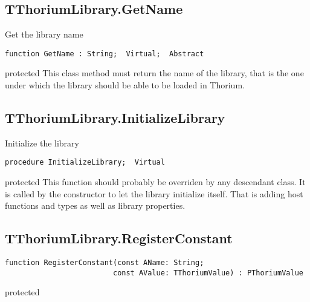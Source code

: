 \subsection{TThoriumLibrary.GetName}
\label{thoriumcorepkg:thorium:tthoriumlibrary:getname}
\begin{FPCList}
\Synopsis
Get the library name\Declaration 

\begin{verbatim}
function GetName : String;  Virtual;  Abstract
\end{verbatim}
\Visibility
protected
\Description
This class method must return the name of the library, that is the one under which the library should be able to be loaded in Thorium.\end{FPCList}
\subsection{TThoriumLibrary.InitializeLibrary}
\label{thoriumcorepkg:thorium:tthoriumlibrary:initializelibrary}
\begin{FPCList}
\Synopsis
Initialize the library\Declaration 

\begin{verbatim}
procedure InitializeLibrary;  Virtual
\end{verbatim}
\Visibility
protected
\Description
This function should probably be overriden by any descendant class. It is called by the constructor to let the library initialize itself. That is adding host functions and types as well as library properties.\end{FPCList}
\subsection{TThoriumLibrary.RegisterConstant}
\label{thoriumcorepkg:thorium:tthoriumlibrary:registerconstant}
\begin{FPCList}
\Declaration 

\begin{verbatim}
function RegisterConstant(const AName: String;
                         const AValue: TThoriumValue) : PThoriumValue
\end{verbatim}
\Visibility
protected
\end{FPCList}
